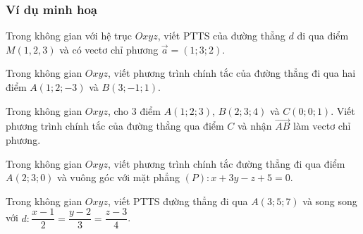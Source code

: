 	\subsubsection{Ví dụ minh hoạ}
	\begin{vd}%
	Trong không gian với hệ trục $Oxyz$, viết PTTS của đường thẳng $d$ đi qua điểm $M(1,2,3)$ và có vectơ chỉ phương $\vec{a}=(1;3;2)$.
	\end{vd}
	\begin{vd}%
	Trong không gian $Oxyz$, viết phương trình chính tắc của đường thẳng đi qua hai điểm $A(1;2;-3)$ và $B(3;-1;1)$.
	\end{vd}
	\begin{vd}%
	Trong không gian $Oxyz$, cho $3$ điểm $A(1;2;3)$, $B(2;3;4)$ và $C(0;0;1)$. Viết phương trình chính tắc của đường thẳng qua điểm $C$ và nhận $\overrightarrow{AB}$ làm vectơ chỉ phương.
	\end{vd}
	\begin{vd}%
	Trong không gian $Oxyz$, viết phương trình chính tắc đường thẳng đi qua điểm $A(2;3;0)$ và vuông góc với mặt phẳng $(P): x + 3y - z + 5 = 0.$
	\end{vd}
	\begin{vd}%
	Trong không gian $Oxyz$, viết PTTS đường thẳng đi qua $A\left(3;5;7\right)$ và song song với $d:\dfrac{x-1}{2}=\dfrac{y-2}{3}=\dfrac{z-3}{4}$.
	\end{vd}
